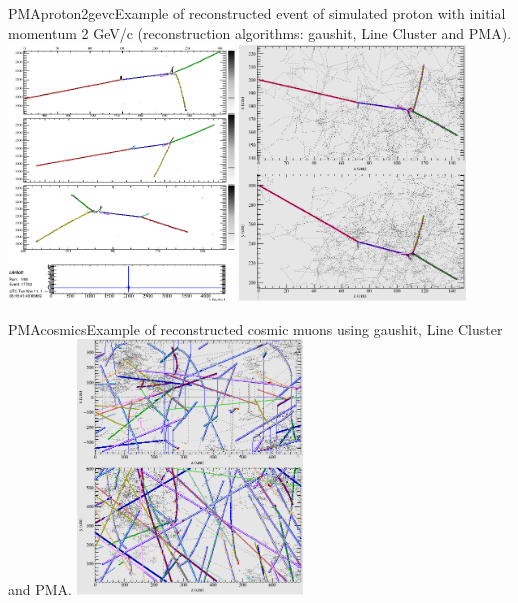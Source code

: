 \begin{cdrfigure}{PMAproton2gevc}{Example of reconstructed event of simulated proton with initial momentum 2 GeV/c (reconstruction algorithms: gaushit, Line Cluster and PMA).}
\includegraphics[width=0.45\textwidth]{figures/evdtwqproj117703.png}
\includegraphics[width=0.45\textwidth]{figures/evdlarortho3d117703.png}
\end{cdrfigure}
\begin{cdrfigure}{PMAcosmics}{Example of reconstructed cosmic muons using gaushit, Line Cluster and PMA.}
\includegraphics[width=0.45\textwidth]{figures/evdlarortho3d11302.png}
\end{cdrfigure}


